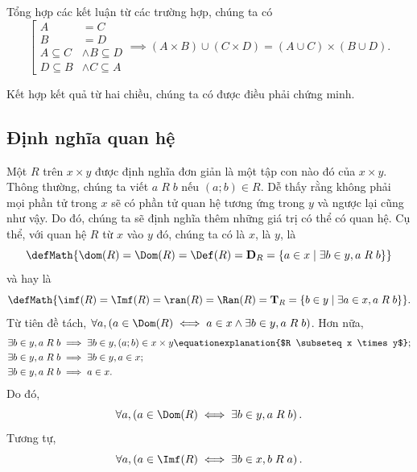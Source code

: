 Tổng hợp các kết luận từ các trường hợp, chúng ta có
\begin{equation*}
   \left[\begin{aligned}
      A &= C \\
      B &= D \\
      A \subseteq C &\land B \subseteq D \\
      D \subseteq B &\land C \subseteq A 
   \end{aligned}\right. \implies  (A \times B) \cup (C \times D) = (A \cup C) \times (B \cup D).
\end{equation*}

Kết hợp kết quả từ hai chiều, chúng ta có được điều phải chứng minh.
   
\subsection{Định nghĩa quan hệ}

Một  $R$ trên $x \times y$ được định nghĩa đơn giản là một tập con nào đó của $x \times y$. Thông thường, chúng ta viết $a\;R\;b$ nếu $(a; b) \in R$. Dễ thấy rằng không phải mọi phần tử trong $x$ sẽ có phần tử quan hệ tương ứng trong $y$ và ngược lại cũng như vậy. Do đó, chúng ta sẽ định nghĩa thêm những giá trị có thể có quan hệ. Cụ thể, với quan hệ $R$ từ $x$ vào $y$ đó, chúng ta có  là $x$,  là $y$,  là
\begin{equation*}
   \defMath{\dom(R) = \Dom(R) = \Def(R) = \mathbf{D}_R = \{a \in x \mid \exists b \in y, a\;R\;b\}}
\end{equation*}
và  hay  là
\begin{equation*}
   \defMath{\imf(R) = \Imf(R) = \ran(R) = \Ran(R) = \mathbf{T}_R = \{b \in y \mid \exists a \in x, a\;R\;b\}}.
\end{equation*}
Từ tiên đề tách, $\forall a, (a \in \Dom(R) \iff a \in x \land \exists b \in y, a\;R\;b)$. Hơn nữa, \begin{align*}
   \exists b \in y, a\;R\;b &\implies \exists b \in y, (a; b) \in x \times y \equationexplanation{$R \subseteq x \times y$};\\
   \exists b \in y, a\;R\;b &\implies \exists b \in y, a \in x;\\
   \exists b \in y, a\;R\;b &\implies a \in x.
\end{align*}
Do đó, \begin{equation*}
   \forall a, \left(a \in \Dom(R) \iff \exists b \in y, a\;R\;b\right).
\end{equation*}
Tương tự, \begin{equation*}
   \forall a, \left(a \in \Imf(R) \iff \exists b \in x, b\;R\;a\right).
\end{equation*}

